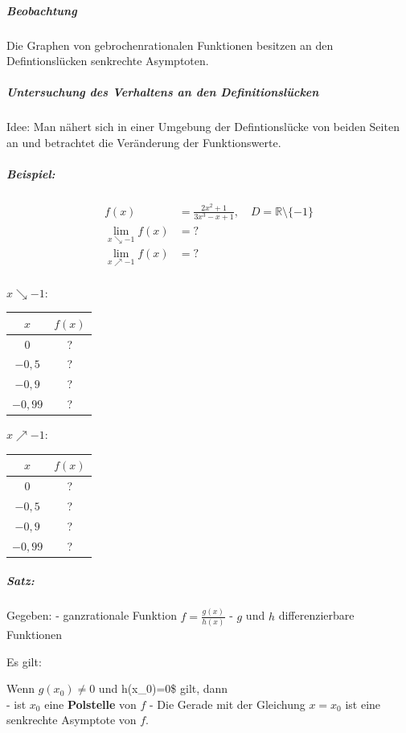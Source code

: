 \documentclass[
  letterpaper,
  DIV=11,
  numbers=noendperiod]{scrartcl}
\let\oldsubparagraph\subparagraph
\renewcommand{\subparagraph}[1]{\oldsubparagraph{#1}\mbox{}}
\begin{document}
\subparagraph{Beobachtung}\label{beobachtung-1}

Die Graphen von gebrochenrationalen Funktionen besitzen an den
Defintionslücken senkrechte Asymptoten.

\subparagraph{Untersuchung des Verhaltens an den
Definitionslücken}\label{untersuchung-des-verhaltens-an-den-definitionsluxfccken}

Idee: Man nähert sich in einer Umgebung der Defintionslücke von beiden
Seiten an und betrachtet die Veränderung der Funktionswerte.

\subparagraph{Beispiel:}\label{beispiel-1}

\[
\begin{aligned}
f(x)&=\frac{2x^2+1}{3x^3-x+1}, \quad D=\mathbb{R} \setminus \{ -1\} \\
\lim_{x \searrow -1} f(x) &= ?\\
\lim_{x \nearrow -1} f(x) &= ?\\
\end{aligned}\]

\(x \searrow -1\):

\begin{longtable}[]{@{}cc@{}}
\toprule\noalign{}
\(x\) & \(f(x)\) \\
\midrule\noalign{}
\endhead
\bottomrule\noalign{}
\endlastfoot
\(0\) & ? \\
\(-0,5\) & ? \\
\(-0,9\) & ? \\
\(-0,99\) & ? \\
\end{longtable}

\(x \nearrow -1\):

\begin{longtable}[]{@{}cc@{}}
\toprule\noalign{}
\(x\) & \(f(x)\) \\
\midrule\noalign{}
\endhead
\bottomrule\noalign{}
\endlastfoot
\(0\) & ? \\
\(-0,5\) & ? \\
\(-0,9\) & ? \\
\(-0,99\) & ? \\
\end{longtable}

\subparagraph{Satz:}\label{satz}

Gegeben: - ganzrationale Funktion \(f=\frac{g(x)}{h(x)}\) - \(g\) und
\(h\) differenzierbare Funktionen

Es gilt:

Wenn \(g(x_0)\neq 0\) und h(x\_0)=0\$ gilt, dann\\
- ist \(x_0\) eine \textbf{Polstelle} von \(f\) - Die Gerade mit der
Gleichung \(x=x_0\) ist eine senkrechte Asymptote von \(f\).
\end{document}
